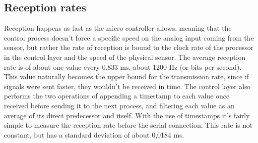 
\subsection{Reception rates}
\label{recrates}
Reception happens as fast as the micro controller allows, meaning that the control process doesn't force a specific speed on the analog input coming from the sensor, but rather the rate of reception is bound to the clock rate of the processor in the control layer and the speed of the physical sensor.
The average reception rate is of about one value every 0.833 ms, about 1200 Hz (or bits per second).
This value naturally becomes the upper bound for the transmission rate, since if signals were sent faster, they wouldn't be received in time. 
The control layer also performs the two operations of appending a timestamp to each value once received before sending it to the next process, and filtering each value as an average of its direct predecessor and itself.
With the use of timestamps it's fairly simple to measure the reception rate before the serial connection.
This rate is not constant, but has a standard deviation of about 0,0184 ms.



